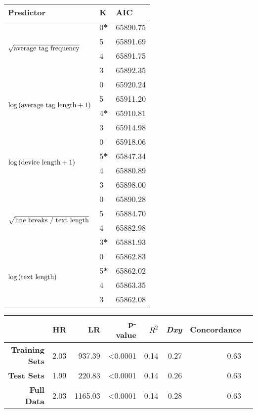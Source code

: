 \documentclass[]{interact}\usepackage[]{graphicx}\usepackage[]{color}
\begin{document}
\begin{table}[p]%
{} 
{\begin{tabular}{| L{5cm} | l | l |}
  \hline
  \textbf{Predictor} & \textbf{K} & \textbf{AIC} \\ 
  \hline
  & 0\textbf{*} & 65890.75 \\ 
  & 5 & 65891.69 \\ 
  & 4 & 65891.75 \\ 
  & 3 & 65892.35 \\ 
  \hline
  & 0 & 65920.24 \\ 
  & 5 & 65911.20 \\ 
  & 4\textbf{*} & 65910.81 \\ 
  & 3 & 65914.98 \\ 
  \hline
  & 0 & 65918.06 \\ 
  & 5\textbf{*} & 65847.34 \\ 
  & 4 & 65880.89 \\ 
  & 3 & 65898.00 \\ 
  \hline
  & 0 & 65890.28 \\ 
  & 5 & 65884.70 \\ 
  & 4 & 65882.98 \\ 
  & 3\textbf{*} & 65881.93 \\ 
  \hline
  & 0 & 65862.83 \\ 
  & 5\textbf{*} & 65862.02 \\ 
  & 4 & 65863.35 \\ 
  & 3 & 65862.08 \\ 
  \hline
\end{tabular}}
\label{table:2}
\end{table}

\begin{table}[p]%
{}
{\begin{tabular}{|r|r|r|r|r|r|r|r|}
  \hline
 & \textbf{HR} & \textbf{LR} & \textbf{p-value} & \textbf{$R^2$} & \textbf{\textit{Dxy}} & \textbf{Concordance} \\ 
  \hline
  \textbf{Training Sets} & 2.03 & 937.39  & \textless0.0001 & 0.14 & 0.27 & 0.63 \\ 
  \textbf{Test Sets}     & 1.99 & 220.83  & \textless0.0001 & 0.14 & 0.26 & 0.63 \\
  \textbf{Full Data}     & 2.03 & 1165.03 & \textless0.0001 & 0.14 & 0.28 & 0.63 \\ 
   \hline
\end{tabular}}
\label{table:3}
\end{table}
\end{document}
